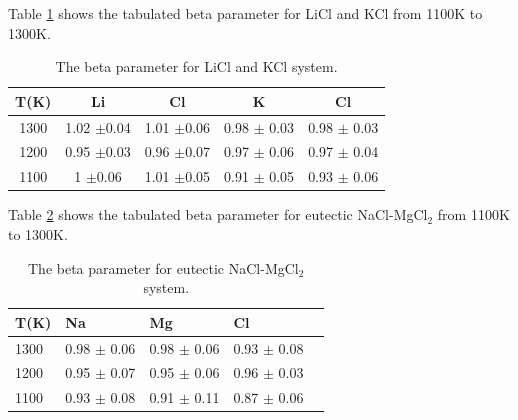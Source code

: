 \documentclass[review]{elsarticle}
\begin{document}
Table \ref{table:licl and kcl-beta} shows the tabulated beta parameter for LiCl and KCl from 1100K to 1300K.
\begin{table}[h!]
\centering
\caption{The beta parameter for LiCl and KCl system. }
\begin{tabular}{|c|cc|cc|}
\hline
T(K) & Li         & Cl         & K           & Cl          \\
\hline
1300 & 1.02 $\pm$0.04 & 1.01 $\pm$0.06 & 0.98 $\pm$ 0.03 & 0.98 $\pm$ 0.03 \\
1200 & 0.95 $\pm$0.03 & 0.96 $\pm$0.07 & 0.97 $\pm$ 0.06 & 0.97 $\pm$ 0.04 \\
1100 & 1 $\pm$0.06    & 1.01 $\pm$0.05 & 0.91 $\pm$ 0.05 & 0.93 $\pm$ 0.06 \\
\hline
\end{tabular}
\label{table:licl and kcl-beta}
\end{table}
\FloatBarrier

Table \ref{table:nacl-mgcl2-beta} shows the tabulated beta parameter for eutectic NaCl-MgCl$_2$ from 1100K to 1300K. 
\begin{table}[h!]
\centering
\caption{The beta parameter for eutectic NaCl-MgCl$_2$ system. }
\begin{tabular}{lllll}
\hline
T(K) & Na          & Mg          & Cl          &  \\
\hline
1300 & 0.98 $\pm$ 0.06 & 0.98 $\pm$ 0.06 & 0.93 $\pm$ 0.08 &  \\
1200 & 0.95 $\pm$ 0.07 & 0.95 $\pm$ 0.06 & 0.96 $\pm$ 0.03 &  \\
1100 & 0.93 $\pm$ 0.08 & 0.91 $\pm$ 0.11 & 0.87 $\pm$ 0.06 &  \\
\hline
\end{tabular}
\label{table:nacl-mgcl2-beta}
\end{table} 
\FloatBarrier
\end{document}
